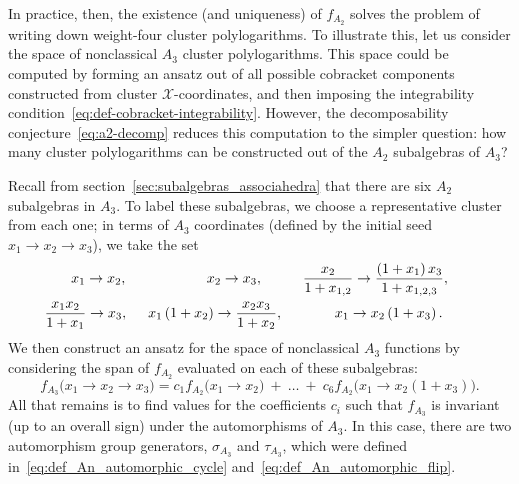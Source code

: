 \documentclass[12pt]{article}
\def\xcoords{$\mathcal{X}$-coordinates}
\begin{document}
In practice, then, the existence (and uniqueness) of $f_{A_2}$ solves the problem of writing down weight-four cluster polylogarithms. To illustrate this, let us consider the space of nonclassical $A_3$ cluster polylogarithms. This space could be computed by forming an ansatz out of all possible cobracket components constructed from cluster \xcoords, and then imposing the integrability condition~\eqref{eq:def-cobracket-integrability}. However, the decomposability conjecture~\eqref{eq:a2-decomp} reduces this computation to the simpler question: how many cluster polylogarithms can be constructed out of the $A_2$ subalgebras of $A_3$? 

Recall from section~\ref{sec:subalgebras_associahedra} that there are six $A_2$ subalgebras in $A_3$. To label these subalgebras, we choose a representative cluster from each one; in terms of $A_3$ coordinates (defined by the initial seed $x_1 \to x_2 \to x_3$), we take the set
\begin{gather}
	x_1 \to x_2, \hspace{2cm}
	x_2 \to x_3, \hspace{1cm}
	\frac{x_2}{1+x_{1,2}} \to \frac{\left(1+x_1\right) x_3}{1+x_{1,2,3}},  \\
	\frac{x_1 x_2}{1+x_1} \to x_3, \hspace{.5cm}
	x_1 \left(1+x_2\right) \to \frac{x_2 x_3}{1+x_2}, \hspace{1.3cm}
	x_1 \to x_2 \left(1+x_3\right). \hspace{.8cm}  \label{eq:a2-in-a3}
\end{gather}
We then construct an ansatz for the space of nonclassical $A_3$ functions by considering the span of $f_{A_2}$ evaluated on each of these subalgebras:
\begin{equation}\label{eq:fa3-ansatz}
	f_{A_3}\big(x_1\to x_2\to x_3 \big) = c_1 f_{A_2}\big(x_1 \to x_2\big) \ +\ \ldots \ +\ c_6 f_{A_2}\big(x_1\to x_2 \left(1+x_3\right)\big).
\end{equation}	
All that remains is to find values for the coefficients $c_i$ such that $f_{A_3}$ is invariant (up to an overall sign) under the automorphisms of $A_3$. In this case, there are two automorphism group generators, $\sigma_{A_3}$ and $\tau_{A_3}$, which were defined in~\eqref{eq:def_An_automorphic_cycle} and~\eqref{eq:def_An_automorphic_flip}.  
\end{document}

